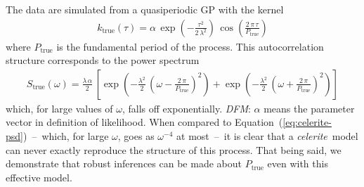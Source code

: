 \documentclass[manuscript, letterpaper]{aastex6}
\newcommand{\celeriteterm}{\emph{celerite}}
\renewcommand{\eqref}[1]{\ref{eq:#1}}
\newcommand{\Eq}[1]{Equation~(\eqref{#1})}
\newcommand{\eq}[1]{\Eq{#1}}
\newcommand{\eqlabel}[1]{\label{eq:#1}}
\newcommand{\todo}[3]{{\color{#2}\emph{#1}: #3}}
\newcommand{\dfmtodo}[1]{\todo{DFM}{red}{#1}}
\begin{document}
The data are simulated from a quasiperiodic GP with the kernel
\begin{eqnarray}\eqlabel{sim-wrong-true}
k_\mathrm{true} (\tau) = \alpha\,
    \exp\left(-\frac{\tau^2}{2\,\lambda^2}\right)\,
    \cos\left(\frac{2\,\pi\,\tau}{P_\mathrm{true}}\right)
\end{eqnarray}
where $P_\mathrm{true}$ is the fundamental period of the process.
This autocorrelation structure corresponds to the power spectrum
\citep{Wilson:2013}
\begin{eqnarray}
S_\mathrm{true} (\omega) = \frac{\lambda\,\alpha}{2}\,\left[
    \exp\left(-\frac{\lambda^2}{2}\,\left(\omega-
        \frac{2\,\pi}{P_\mathrm{true}}\right)^2\right) +
    \exp\left(-\frac{\lambda^2}{2}\,\left(\omega+
        \frac{2\,\pi}{P_\mathrm{true}}\right)^2\right)
\right]
\end{eqnarray}
which, for large values of $\omega$, falls off exponentially. \dfmtodo{$\alpha$
means the parameter vector in definition of likelihood.}
When compared to \eq{celerite-psd}~--~which, for large $\omega$, goes as
$\omega^{-4}$ at most~--~it is clear that a \celeriteterm\ model can never
exactly reproduce the structure of this process.
That being said, we demonstrate that robust inferences can be made about
$P_\mathrm{true}$ even with this effective model.
\end{document}
